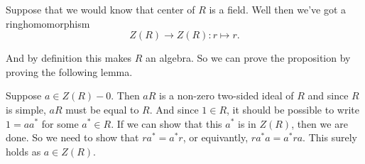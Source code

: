 Suppose that we would know that center of $R$ is a field. Well then we've got a ringhomomorphism 
\[Z(R) \to Z(R) : r \mapsto r .\]
\par And by definition this makes $R$ an algebra. So we can prove the proposition by proving the following lemma. 

Suppose $a\in Z(R)-{0}$. Then $aR$ is a non-zero two-sided ideal of $R$ and since $R$ is simple, $aR$ must be equal to $R$. And since $1 \in R$, it should be possible to write $1 = aa^*$ for some $a^* \in R$. If we can show that this $a^*$ is in $Z(R)$, then we are done. So we need to show that $ra^*=a^*r$, or equivantly, $ra^*a=a^*ra$. This surely holds as $a\in Z(R)$. 

